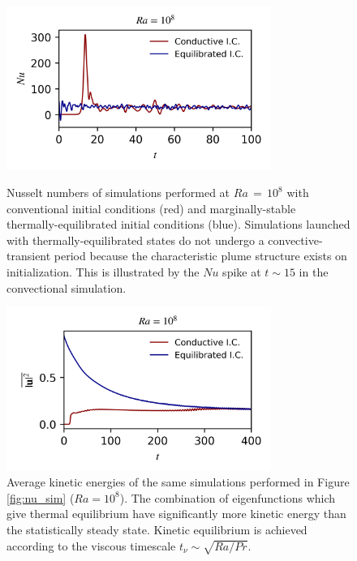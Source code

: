 \documentclass[reprint,amsmath,amssymb,aps]{revtex4-1}
\begin{document}
\begin{figure}[t]
    \begin{minipage}[t]{3.4in}
        \centering
        \includegraphics[width=3.4in]{sim_eq_nu.png}
        \caption{Nusselt numbers of simulations performed at $Ra \, = \, 10^8$ with conventional initial conditions (red) and marginally-stable thermally-equilibrated initial conditions (blue). Simulations launched with thermally-equilibrated states do not undergo a convective-transient period because the characteristic plume structure exists on initialization. This is illustrated by the $Nu$ spike at $t \sim 15$ in the convectional simulation.}
        \label{fig:nu_sim}
    \end{minipage}
    \hfill
    \begin{minipage}[t]{3.4in}
        \centering
        \includegraphics[width=3.4in]{sim_eq_ke.png}
        \caption{Average kinetic energies of the same simulations performed in Figure \ref{fig:nu_sim} ($Ra = 10^8$). The combination of eigenfunctions which give thermal equilibrium have significantly more kinetic energy than the statistically steady state. Kinetic equilibrium is achieved according to the viscous timescale $t_{\nu} \sim \sqrt{Ra / Pr}$.}
        \label{fig:ke_sim}
    \end{minipage}
\end{figure}
\end{document}
